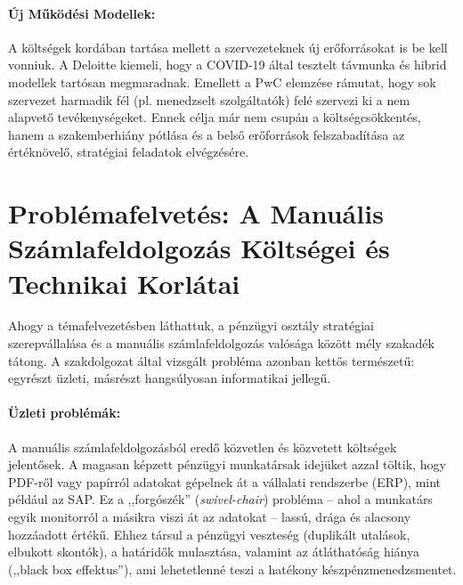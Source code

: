 \paragraph{Új Működési Modellek:} A költségek kordában tartása mellett a szervezeteknek új erőforrásokat is be kell vonniuk.
A Deloitte kiemeli, hogy a COVID-19 által tesztelt távmunka és hibrid modellek tartósan megmaradnak\cite{Deloitte-Finance-2025}.
Emellett a PwC elemzése rámutat, hogy sok szervezet harmadik fél (pl. menedzselt szolgáltatók) felé szervezi ki a nem alapvető tevékenységeket.
Ennek célja már nem csupán a költségcsökkentés, hanem a szakemberhiány pótlása és a belső erőforrások felszabadítása az értéknövelő, stratégiai feladatok elvégzésére\cite{PwC-Future-of-Finance}.


\section{Problémafelvetés: A Manuális Számlafeldolgozás Költségei és Technikai Korlátai}
\label{sec:problemafelvetes}

Ahogy a témafelvezetésben láthattuk, a pénzügyi osztály stratégiai szerepvállalása és a manuális számlafeldolgozás valósága között mély szakadék tátong. A szakdolgozat által vizsgált probléma azonban kettős természetű: egyrészt üzleti, másrészt hangsúlyosan informatikai jellegű.

\paragraph{Üzleti problémák:} A manuális számlafeldolgozásból eredő közvetlen és közvetett költségek jelentősek. A magasan képzett pénzügyi munkatársak idejüket azzal töltik, hogy PDF-ről vagy papírról adatokat gépelnek át a vállalati rendszerbe (ERP), mint például az SAP\cite{Ardent-ePayables-Report}. Ez a ,,forgószék'' (\textit{swivel-chair}) probléma – ahol a munkatárs egyik monitorról a másikra viszi át az adatokat – lassú, drága és alacsony hozzáadott értékű. Ehhez társul a pénzügyi veszteség (duplikált utalások, elbukott skontók), a határidők mulasztása, valamint az átláthatóság hiánya (,,black box effektus''), ami lehetetlenné teszi a hatékony készpénzmenedzsmentet\cite{Ardent-ePayables-Report}.

